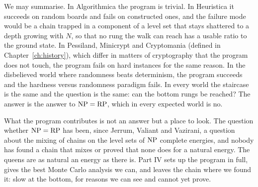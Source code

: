 We may summarise. In Algorithmica the program is trivial. In Heuristica it succeeds on random boards and fails on constructed ones, and the failure mode would be a chain trapped in a component of a level set that stays shattered to a depth growing with $N$, so that no rung the walk can reach has a usable ratio to the ground state. In Pessiland, Minicrypt and Cryptomania (defined in Chapter~\ref{ch:history}), which differ in matters of cryptography that the program does not touch, the program fails on hard instances for the same reason. In the disbelieved world where randomness beats determinism, the program succeeds and the hardness versus randomness paradigm fails. In every world the staircase is the same and the question is the same: can the bottom rungs be reached? The answer is the answer to $\mathrm{NP} = \mathrm{RP}$, which in every expected world is no.

What the program contributes is not an answer but a place to look. The question whether $\mathrm{NP} = \mathrm{RP}$ has been, since Jerrum, Valiant and Vazirani, a question about the mixing of chains on the level sets of $\mathrm{NP}$ complete energies, and nobody has found a chain that mixes or proved that none does for a natural energy. The queens are as natural an energy as there is. Part IV sets up the program in full, gives the best Monte Carlo analysis we can, and leaves the chain where we found it: slow at the bottom, for reasons we can see and cannot yet prove.
